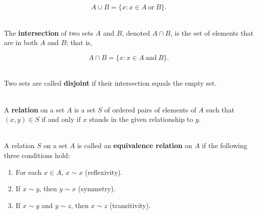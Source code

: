 \begin{alphasection}
\begin{definition}
		\[A \cup B = \{x : x \in A\ \text{or}\ B\}.\]
	\end{definition}

	\begin{definition}
		\hfill\\
		The \textbf{intersection} of two sets $A$ and $B$, denoted $A \cap B$, is the set of elements that are in both $A$ and $B$; that is,

		\[A \cap B = \{x : x \in A\ \text{and}\ B\}.\]
	\end{definition}

	\begin{definition}
		\hfill\\
		Two sets are called \textbf{disjoint} if their intersection equals the empty set.
	\end{definition}

	\begin{definition}
		\hfill\\
		A \textbf{relation} on a set $A$ is a set $S$ of ordered pairs of elements of $A$ such that $(x,y) \in S$ if and only if $x$ stands in the given relationship to $y$.
	\end{definition}

	\begin{definition}
		\hfill\\
		A relation $S$ on a set $A$ is called an \textbf{equivalence relation} on $A$ if the following three conditions hold:

		\begin{enumerate}
			\item For each $x \in A$, $x \sim x$  (reflexivity).
			\item If $x \sim y$, then $y \sim x$  (symmetry).
			\item If $x \sim y$ and $y \sim z$, then $x \sim z$  (transitivity).
		\end{enumerate}
	\end{definition}
\end{alphasection}
